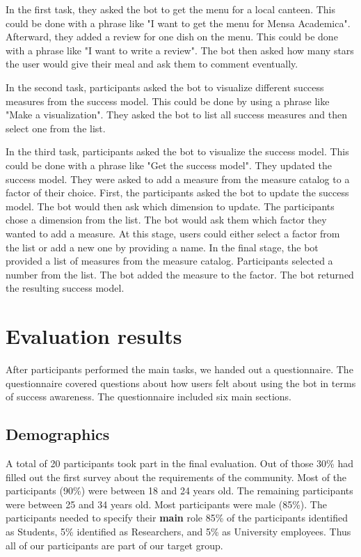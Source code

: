 In the first task, they asked the bot to get the menu for a local canteen. This could be done with a phrase like "I want to get the menu for Mensa Academica".
Afterward, they added a review for one dish on the menu. This could be done with a phrase like "I want to write a review". The bot then asked how many stars the user would give their meal and ask them to comment eventually.  

In the second task, participants asked the bot to visualize different success measures from the success model. This could be done by using a phrase like "Make a visualization". They asked the bot to list all success measures and then select one from the list.

In the third task, participants asked the bot to visualize the success model. This could be done with a phrase like "Get the success model". They updated the success model. They were asked to add a measure from the measure catalog to a factor of their choice. 
First, the participants asked the bot to update the success model. The bot would then ask which dimension to update. 
The participants chose a dimension from the list. 
The bot would ask them which factor they wanted to add a measure. 
At this stage, users could either select a factor from the list or add a new one by providing a name. 
In the final stage, the bot provided a list of measures from the measure catalog.
Participants selected a number from the list. 
The bot added the measure to the factor.
The bot returned the resulting success model.

\section{Evaluation results}

After participants performed the main tasks, we handed out a questionnaire.
The questionnaire covered questions about how users felt about using the bot in terms of success awareness. The questionnaire included six main sections. 

\subsection{Demographics}
A total of 20 participants took part in the final evaluation. Out of those 30\% had filled out the first survey about the requirements of the community. 
Most of the participants (90\%) were between 18 and 24 years old. The remaining participants were between 25 and 34 years old. Most participants were male (85\%).
The participants needed to specify their \textbf{main} role 85\% of the participants identified as Students, 5\% identified as Researchers, and 5\% as University employees. Thus all of our participants are part of our target group.

